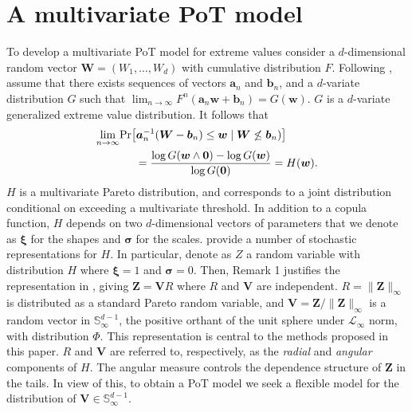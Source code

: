 \section{A multivariate PoT model\label{sec:multivariatepot}}
To develop a multivariate PoT model for extreme values consider a 
    $d$-dimensional random vector $\bm{W} = (W_1, \ldots ,W_d)$ with
    cumulative distribution $F$. Following \cite{RoSeWa2018a}, assume 
    that there exists sequences of vectors $\bm{a}_n$ and $\bm{b}_n$,
    and a $d$-variate distribution $G$ such that 
    $\lim_{n\rightarrow\infty} F^n(\bm{a}_n \bm{w} + \bm{b}_n) = 
    G(\bm{w})$. $G$ is a $d$-variate generalized extreme value 
    distribution. It follows that
    \begin{equation*}
        \begin{aligned}
        \lim\limits_{n\rightarrow\infty} &\prob{\bm{a}^{-1}_n (\bm{W} - \bm{b}_n) 
      \leq \bm{w} \mid \bm{W} \not\leq \bm{b}_n)} \\ 
        &\hspace{0.5cm}= \frac{\log G(\bm{w} \wedge \bm{0}) 
        - \log G(\bm{w}) }{\log G(\bm{0})} = H(\bm{w}).
        \end{aligned}
    \end{equation*}
    $H$ is a multivariate Pareto distribution, and corresponds to a joint
    distribution conditional on exceeding a multivariate threshold. In addition to
    a copula function, $H$ depends on two $d$-dimensional vectors of 
    parameters that we denote as $\bm{\xi}$ for the shapes and $\bm{\sigma}$ 
    for the scales. \cite{RoSeWa2018a} provide a number of stochastic 
    representations for $H$.  In particular, denote as $Z$ a
    random variable with distribution $H$ where $\bm{\xi}= 1$ and 
    $\bm{\sigma} = 0$.  Then, Remark 1 justifies the representation in 
    \cite{ferreira2014}, giving $\bm{Z} = \bm{V}R$
    where $R$ and $\bm{V}$ are independent. $R = \|\bm{Z}\|_\infty$ is 
    distributed as a standard Pareto random variable, and $\bm{V} = 
    \bm{Z}/\|\bm{Z}\|_\infty$ is a random vector in  
    $\mathbb{S}_{\infty}^{d-1}$, the positive orthant of the 
    unit sphere under $\mathcal{L}_{\infty}$ norm, with distribution $\Phi$. 
    This representation is central to the methods proposed in this paper.
    $R$ and $\bm{V}$ are referred to, respectively, as the {\em radial} 
    and {\em angular} components of $H$. The angular measure controls 
    the dependence  structure of $\bm{Z}$  in the tails. In view of 
    this, to obtain a  PoT model we seek a flexible model for the 
    distribution of $\bm{V} \in {\mathbb S}_{\infty}^{d-1}$.

